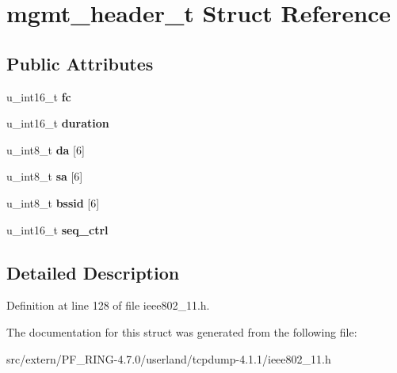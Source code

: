 \hypertarget{structmgmt__header__t}{
\section{mgmt\_\-header\_\-t Struct Reference}
\label{structmgmt__header__t}
}
\subsection*{Public Attributes}
\begin{DoxyCompactItemize}
\item 
\hypertarget{structmgmt__header__t_ae30f858758bb3b7ffdbee35c3a90f93d}{
u\_\-int16\_\-t {\bfseries fc}}
\label{structmgmt__header__t_ae30f858758bb3b7ffdbee35c3a90f93d}

\item 
\hypertarget{structmgmt__header__t_ad9e3ac7a58421508f3727c3211f6c60b}{
u\_\-int16\_\-t {\bfseries duration}}
\label{structmgmt__header__t_ad9e3ac7a58421508f3727c3211f6c60b}

\item 
\hypertarget{structmgmt__header__t_a9396c8aa2f1d5a5e8c557c9b67be6e8d}{
u\_\-int8\_\-t {\bfseries da} \mbox{[}6\mbox{]}}
\label{structmgmt__header__t_a9396c8aa2f1d5a5e8c557c9b67be6e8d}

\item 
\hypertarget{structmgmt__header__t_a51d776e67568608b68aade25a30d7173}{
u\_\-int8\_\-t {\bfseries sa} \mbox{[}6\mbox{]}}
\label{structmgmt__header__t_a51d776e67568608b68aade25a30d7173}

\item 
\hypertarget{structmgmt__header__t_ac5e52444f7eab42afa4d2db4de38bdf5}{
u\_\-int8\_\-t {\bfseries bssid} \mbox{[}6\mbox{]}}
\label{structmgmt__header__t_ac5e52444f7eab42afa4d2db4de38bdf5}

\item 
\hypertarget{structmgmt__header__t_a9b2379328bb0e24f0d947549e7d1fd90}{
u\_\-int16\_\-t {\bfseries seq\_\-ctrl}}
\label{structmgmt__header__t_a9b2379328bb0e24f0d947549e7d1fd90}

\end{DoxyCompactItemize}


\subsection{Detailed Description}


Definition at line 128 of file ieee802\_\-11.h.



The documentation for this struct was generated from the following file:\begin{DoxyCompactItemize}
\item 
src/extern/PF\_\-RING-\/4.7.0/userland/tcpdump-\/4.1.1/ieee802\_\-11.h\end{DoxyCompactItemize}
